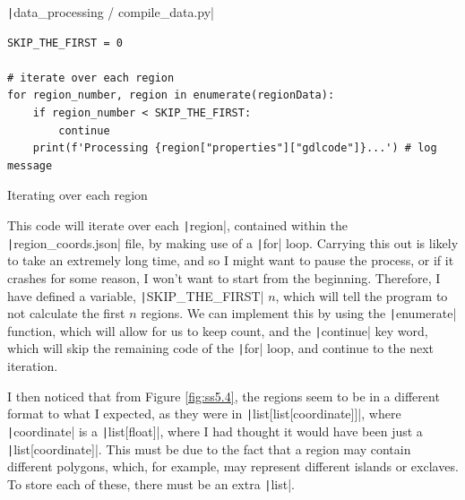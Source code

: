 \documentclass[12pt]{report}
\newcommand{\pil}[1]{\protect\texttt|#1|}
\begin{document}
\begin{listing}[H]
\pil{data_processing / compile_data.py}
\begin{verbatim}
SKIP_THE_FIRST = 0

# iterate over each region
for region_number, region in enumerate(regionData):
    if region_number < SKIP_THE_FIRST:
        continue
    print(f'Processing {region["properties"]["gdlcode"]}...') # log message
\end{verbatim}
\caption{Iterating over each region}\label{cs:iterateRegions}
\end{listing}

This code will iterate over each \pil{region}, contained within the \pil{region_coords.json} file, by making use of a \pil{for} loop. Carrying this out is likely to take an extremely long time, and so I might want to pause the process, or if it crashes for some reason, I won't want to start from the beginning. Therefore, I have defined a variable, \pil{SKIP_THE_FIRST} $n$, which will tell the program to not calculate the first $n$ regions. We can implement this by using the \pil{enumerate} function, which will allow for us to keep count, and the \pil{continue} key word, which will skip the remaining code of the \pil{for} loop, and continue to the next iteration.

\begin{center}
\end{center}

I then noticed that from Figure \ref{fig:ss5.4}, the regions seem to be in a different format to what I expected, as they were in \pil{list[list[coordinate]]}, where \pil{coordinate} is a \pil{list[float]}, where I had thought it would have been just a \pil{list[coordinate]}. This must be due to the fact that a region may contain different polygons, which, for example, may represent different islands or exclaves. To store each of these, there must be an extra \pil{list}.
\end{document}
